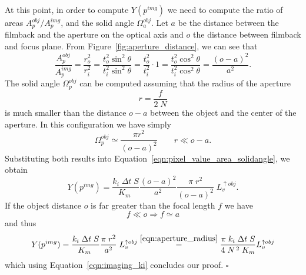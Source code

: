 At this point, in order to compute $Y(p^{img})$ we need to compute the ratio of
areas $A_p^{obj}/A_p^{img}$, and the solid angle $\Omega_a^{obj}$. Let $a$ be the distance between the filmback and the
aperture on the optical axis and $o$ the distance between filmback and focus
plane. From Figure~\ref{fig:aperture_distance}, we can see that
\begin{equation*}
    \frac{A_p^{obj}}{A^{img}_p}
    = \frac{r_o^2}{r_i^2}
    = \frac{t_o^2 \sin^2\theta}{t_i^2 \sin^2\theta}
    = \frac{t_o^2}{t_i^2} \cdot 1
    = \frac{t_o^2 \cos^2\theta}{t_i^2 \cos^2\theta}
    = \frac{(o-a)^2}{a^2}.
\end{equation*}
The solid angle $\Omega_p^{obj}$ can be computed assuming that the radius of the
aperture 
\begin{equation}\label{eqn:aperture_radius}
    r = \frac{f}{2\;N}
\end{equation}
is much smaller than the distance $o-a$ between the object
and the center of the aperture. In this configuration we have simply
\begin{equation}\label{eqn:imaging_omegapobj}
\Omega_p^{obj} \simeq \frac{\pi r^2}{(o-a)^2} \qquad r \ll o-a.
\end{equation}
Substituting both results into Equation~\eqref{eqn:pixel_value_area_solidangle}, we obtain
\begin{equation}\label{eqn:imaging_y2}
Y(p^{img}) =  \frac{k_i\; \Delta t \; S}{K_m\;} \frac{(o-a)^2}{a^2} \frac{\pi\;r^2}{(o-a)^2}\; L_v^{\uparrow obj}.
\end{equation}
If the object distance $o$ is far greater than the focal length $f$ we have
\begin{equation}
f \ll o \Rightarrow  f \simeq a
\end{equation}
and thus
\begin{equation}
  Y(p^{img}) =  \frac{k_i\; \Delta t \; S}{K_m\;} \frac{\pi\;r^2}{a^2}\; L_v^{\uparrow obj} \stackrel{\eqref{eqn:aperture_radius}}{=}
   \frac{\pi\; k_i\; \Delta t \; S}{4\;N^{\,2}\;K_m} L_v^{\uparrow obj} 
\end{equation}
which using Equation~\eqref{eqn:imaging_ki} concludes our proof. \hfill $\square$

%   

